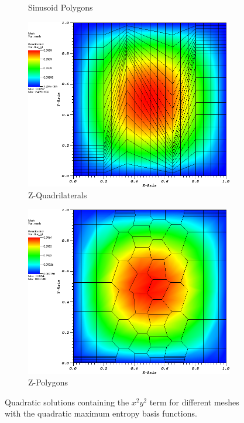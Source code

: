 \begin{figure}
{\begin{subfigure}[b]{0.465\textwidth}
		\caption{Sinusoid Polygons}
	\end{subfigure}
}
{
	\vspace{3mm}
	\begin{subfigure}[b]{0.465\textwidth}
		\centering
		\label{subfig::x2y2_z_quad_me_k2_lin_sol}
		\includegraphics[width=\textwidth]{figures/sec_BF/x2y2Sol_ZQuad_ME2.png}
		\caption{Z-Quadrilaterals}
	\end{subfigure}
	\hfill
	\begin{subfigure}[b]{0.465\textwidth}
		\centering
		\label{subfig::x2y2_z_poly_me_k2_lin_sol}
		\includegraphics[width=\textwidth]{figures/sec_BF/x2y2Sol_ZPoly_ME2.png}
		\caption{Z-Polygons}
	\end{subfigure}
}
\caption{Quadratic solutions containing the $x^2y^2$ term for different meshes with the quadratic maximum entropy basis functions.}
\label{fig::BF_Results_x2y2_sol_ME2}
\end{figure}


